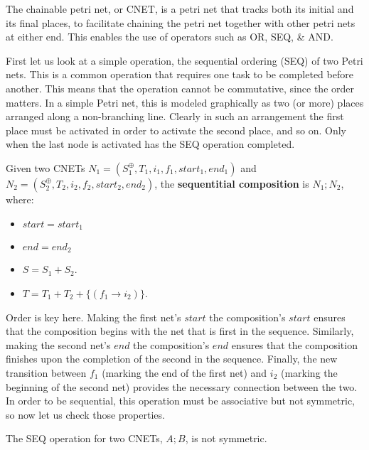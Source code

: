 The chainable petri net, or CNET, is a petri net that tracks both its initial and its final places, to facilitate chaining the petri net together with other petri nets at either end. This enables the use of operators such as OR, SEQ, \& AND.\\
\begin{example}
  \label{ex:SEQ-PN}
First let us look at a simple operation, the sequential ordering (SEQ) of two Petri nets. This is a common operation that requires one task to be completed before another. This means that the operation cannot be commutative, since the order matters. In a simple Petri net, this is modeled graphically as two (or more) places arranged along a non-branching line. Clearly in such an arrangement the first place must be activated in order to activate the second place, and so on. Only when the last node is activated has the SEQ operation completed.    
\end{example}
\begin{definition}
  \label{def:SEQ-PN}
   Given two CNETs $N_1 = (S_1^\oplus, T_1, i_1, f_1, start_1, end_1)$ and $N_2 = (S_2^\oplus, T_2,  i_2, f_2, start_2, end_2)$, the \textbf{sequentitial composition} is  $N_1 ; N_2$, where: 
\begin{itemize} 
\item $start = start_1$
\item $end = end_2$
\item $S = S_1 + S_2$.\\
\item $T = T_1 + T_2 + \{(f_1 \rightarrow i_2)\}$.
\end{itemize} 
Order is key here. Making the first net's $start$ the composition's $start$ ensures that the composition begins with the net that is first in the sequence. Similarly, making the second net's $end$ the composition's $end$ ensures that the composition finishes upon the completion of the second in the sequence. Finally, the new transition between $f_1$ (marking the end of the first net) and $i_2$ (marking the beginning of the second net) provides the necessary connection between the two. 
In order to be sequential, this operation must be associative but not symmetric, so now let us check those properties. 
\end{definition}
\begin {lemma}
 \label{lemma:SEQ-NOT-SYMM}
 The SEQ operation for two CNETs, $A;B$, is not symmetric. 
\end{lemma}
